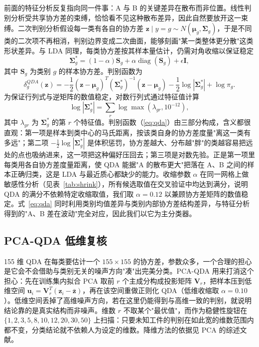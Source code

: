 \documentclass[12pt,a4paper]{article}
\newcommand{\upcite}[1]{\cite{#1}}
\begin{document}
前面的特征分析反复指向同一件事：A 与 B 的关键差异在散布而非位置。线性判别分析受共享协方差的束缚，恰恰看不见这种散布差异，因此自然要放开这一束缚。二次判别分析假设每一类有各自的协方差 $\mathbf{z}\mid y=g\sim N(\boldsymbol{\mu}_g,\boldsymbol{\Sigma}_g)$，于是不同类的二次项不再相消，判别边界变成二次曲面，能够刻画"某一类整体更分散"这类形状差异。与 LDA 同理，每类协方差按其样本量估计，仍需对角收缩以保证稳定
\begin{equation}
\boldsymbol{\Sigma}_g^{*}=(1-\alpha)\mathbf{S}_g+\alpha\operatorname{diag}(\mathbf{S}_g)+\epsilon\mathbf{I},
\end{equation}
其中 $\mathbf{S}_g$ 为类别 $g$ 的样本协方差。判别函数为
\begin{equation}
\delta_g^{QDA}(\mathbf{z})=-\frac{1}{2}(\mathbf{z}-\boldsymbol{\mu}_g)^{T}(\boldsymbol{\Sigma}_g^{*})^{-1}(\mathbf{z}-\boldsymbol{\mu}_g)
-\frac{1}{2}\log|\boldsymbol{\Sigma}_g^{*}|+\log\pi_g.
\label{eq:qda}
\end{equation}
为保证行列式与逆矩阵的数值稳定，对数行列式通过特征值计算
\begin{equation}
\log|\boldsymbol{\Sigma}_g^{*}|=\sum_{r}\log\max(\lambda_{gr},10^{-12}),
\end{equation}
其中 $\lambda_{gr}$ 为 $\boldsymbol{\Sigma}_g^{*}$ 的第 $r$ 个特征值。判别函数（\ref{eq:qda}）由三部分构成，含义都很直观：第一项是样本到类中心的马氏距离，按该类自身的协方差度量"离这一类有多远"；第二项 $-\frac{1}{2}\log|\boldsymbol{\Sigma}_g^{*}|$ 是体积惩罚，协方差越大、分布越"胖"的类越容易把远处的点也吸纳进来，这一项把这种偏好压回去；第三项是对数先验。正是第一项里每类用各自协方差度量距离，使 QDA 能据"A 的散布更大"把落在 A、B 之间的样本正确归类，这是 LDA 与最近质心都缺少的能力。收缩参数 $\alpha$ 在同一网格上做敏感性分析（见表~\ref{tab:shrink}），所有候选取值在交叉验证中均达到满分，说明 QDA 的满分不依赖特定收缩取值，我们取 $\alpha=0.12$ 以兼顾协方差矩阵的数值稳定。式~\eqref{eq:qda} 同时利用类别均值差异与类别内部协方差结构差异，与特征分析得到的"A、B 差在波动"完全对应，因此我们以它为主分类器。

\subsection{PCA-QDA 低维复核}

155 维 QDA 在每类要估计一个 $155\times155$ 的协方差，参数众多，一个合理的担心是它会不会借助与类别无关的噪声方向"凑"出完美分类。PCA-QDA 用来打消这个担心：先在训练集内拟合 PCA 取前 $r$ 个主成分构成投影矩阵 $\mathbf{V}_r$，把样本压到低维空间 $\mathbf{u}_i=\mathbf{V}_r^{T}(\mathbf{z}_i-\bar{\mathbf{z}})$，再在该空间重做正则化 QDA（低维收缩取 $\alpha=0.10$）。低维空间丢掉了高维噪声方向，若在这里仍能得到与高维一致的判别，就说明结论靠的是真实结构而非噪声。维数 $r$ 不取某个"最优值"，而作为稳健性旋钮在 $\{1,2,3,5,8,10,12,20,30,50\}$ 上扫描：只要未知工件的判别在如此宽的维数范围内都不变，分类结论就不依赖人为设定的维数。降维方法的依据见 PCA 的综述文献\upcite{jolliffe2016}。
\end{document}
